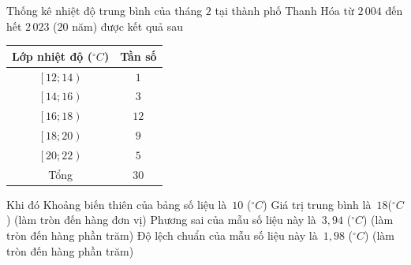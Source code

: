 \begin{ex}%
	Thống kê nhiệt độ trung bình của tháng $2$ tại thành phố Thanh Hóa từ $2\,004$ đến  hết $2\,023$ ($20$ năm) được kết quả sau
	\begin{center}
		\begin{tabular}{|c|c|}
			\hline 
			Lớp nhiệt độ ($^\circ C$)& Tần số \\ 
			 \hline
			$\left[12;14\right)$ & $1$ \\ 
			 \hline
			$\left[14;16\right)$  & $3$ \\
			 \hline
			$\left[16;18\right)$ &  $12$ \\
			 \hline
			 $\left[18;20\right)$ & $9$ \\
			\hline 
			$\left[20;22\right)$ &  $5$ \\
			\hline 
			 Tổng & $30$ \\
			 \hline
		\end{tabular}
	\end{center}
	Khi đó 
	\choiceTF 
		{\True Khoảng biến thiên của bảng  số liệu là~$10$ ($^\circ C$)}
		{Giá trị trung bình là~$18$($^\circ C$)  (làm tròn đến hàng đơn vị)}
		{Phương sai của mẫu số liệu này  là~$3{,}94$ ($^\circ C$) (làm tròn đến hàng phần trăm)}
		{\True Độ lệch chuẩn của mẫu số liệu này là~$1{,}98$  ($^\circ C$) (làm tròn đến hàng phần trăm)}
\end{ex}

